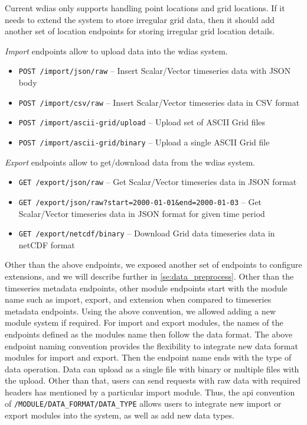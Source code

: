 Current \acrshort{wdias} only supports handling point locations and grid locations. If it needs to extend the system to store irregular grid data, then it should add another set of location endpoints for storing irregular grid location details.

\emph{Import} endpoints allow to upload data into the \acrshort{wdias} system.
\begin{itemize}
    \item \texttt{POST /import/json/raw} -- Insert Scalar/Vector timeseries data with JSON body
    \item \texttt{POST /import/csv/raw} -- Insert Scalar/Vector timeseries data in CSV format
    \item \texttt{POST /import/ascii-grid/upload} -- Upload set of ASCII Grid files
    \item \texttt{POST /import/ascii-grid/binary} -- Upload a single ASCII Grid file
\end{itemize}

\emph{Export} endpoints allow to get/download data from the \acrshort{wdias} system.
\begin{itemize}
    \item \texttt{GET /export/json/raw} -- Get Scalar/Vector timeseries data in JSON format
    \item \texttt{GET /export/json/raw?start=2000-01-01\&end=2000-01-03} -- Get Scalar/Vector timeseries data in JSON format for given time period
    \item \texttt{GET /export/netcdf/binary} -- Download Grid data timeseries data in \acrshort{netCDF} format
\end{itemize}

Other than the above endpoints, we exposed another set of endpoints to configure extensions, and we will describe further in \cref{se:data_preprocess}.
Other than the timeseries metadata endpoints, other module endpoints start with the module name such as import, export, and extension when compared to timeseries metadata endpoints. Using the above convention, we allowed adding a new module system if required.
For import and export modules, the names of the endpoints defined as the modules name then follow the data format. The above endpoint naming convention provides the flexibility to integrate new data format modules for import and export. Then the endpoint name ends with the type of data operation. Data can upload as a single file with binary or multiple files with the upload. Other than that, users can send requests with raw data with required headers has mentioned by a particular import module.
Thus, the \acrshort{api} convention of \texttt{/MODULE/DATA\_FORMAT/DATA\_TYPE} allows users to integrate new import or export modules into the system, as well as add new data types.

